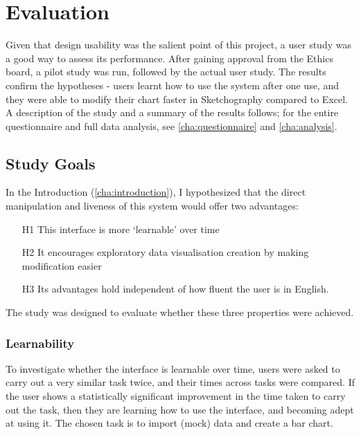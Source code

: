 \chapter{Evaluation}
Given that design usability was the salient point of this project, a user study was a good way to assess its performance. After gaining approval from the Ethics board, a pilot study was run, followed by the actual user study. The results confirm the hypotheses - users learnt how to use the system after one use, and they were able to modify their chart faster in Sketchography compared to Excel. A description of the study and a summary of the results follows; for the entire questionnaire and full data analysis, see \autoref{cha:questionnaire} and \autoref{cha:analysis}.

\section{Study Goals}
In the Introduction (\autoref{cha:introduction}), I hypothesized that the direct manipulation and liveness of this system would offer two advantages:

\begin{enumerate}
\item[H1] This interface is more `learnable' over time
\item[H2] It encourages exploratory data visualisation creation by making modification easier
\item[H3] Its advantages hold independent of how fluent the user is in English.
\end{enumerate}

The study was designed to evaluate whether these three properties were achieved. 

\subsection*{Learnability}
To investigate whether the interface is learnable over time, users were asked to carry out a very similar task twice, and their times across tasks were compared. If the user shows a statistically significant improvement in the time taken to carry out the task, then they are learning how to use the interface, and becoming adept at using it. The chosen task is to import (mock) data and create a bar chart.

